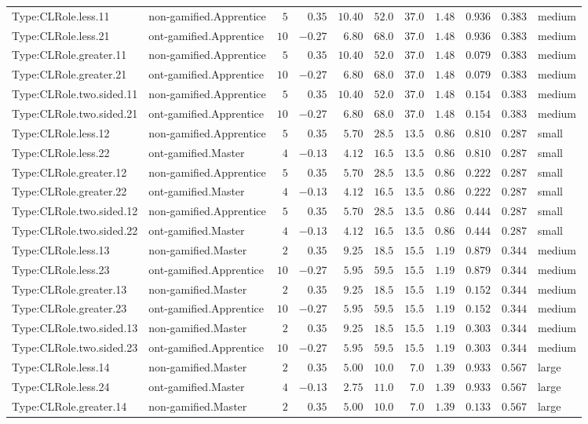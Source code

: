 \documentclass[6pt,a4paper]{article}
\begin{document}
{\begin{longtable}{llrrrrrrrrl}
Type:CLRole.less.11&non-gamified.Apprentice&$ 5$&$ 0.35$&$10.40$&$ 52.0$&$37.0$&$1.48$&$0.936$&$0.383$&medium\tabularnewline
Type:CLRole.less.21&ont-gamified.Apprentice&$10$&$-0.27$&$ 6.80$&$ 68.0$&$37.0$&$1.48$&$0.936$&$0.383$&medium\tabularnewline
Type:CLRole.greater.11&non-gamified.Apprentice&$ 5$&$ 0.35$&$10.40$&$ 52.0$&$37.0$&$1.48$&$0.079$&$0.383$&medium\tabularnewline
Type:CLRole.greater.21&ont-gamified.Apprentice&$10$&$-0.27$&$ 6.80$&$ 68.0$&$37.0$&$1.48$&$0.079$&$0.383$&medium\tabularnewline
Type:CLRole.two.sided.11&non-gamified.Apprentice&$ 5$&$ 0.35$&$10.40$&$ 52.0$&$37.0$&$1.48$&$0.154$&$0.383$&medium\tabularnewline
Type:CLRole.two.sided.21&ont-gamified.Apprentice&$10$&$-0.27$&$ 6.80$&$ 68.0$&$37.0$&$1.48$&$0.154$&$0.383$&medium\tabularnewline
Type:CLRole.less.12&non-gamified.Apprentice&$ 5$&$ 0.35$&$ 5.70$&$ 28.5$&$13.5$&$0.86$&$0.810$&$0.287$&small\tabularnewline
Type:CLRole.less.22&ont-gamified.Master&$ 4$&$-0.13$&$ 4.12$&$ 16.5$&$13.5$&$0.86$&$0.810$&$0.287$&small\tabularnewline
Type:CLRole.greater.12&non-gamified.Apprentice&$ 5$&$ 0.35$&$ 5.70$&$ 28.5$&$13.5$&$0.86$&$0.222$&$0.287$&small\tabularnewline
Type:CLRole.greater.22&ont-gamified.Master&$ 4$&$-0.13$&$ 4.12$&$ 16.5$&$13.5$&$0.86$&$0.222$&$0.287$&small\tabularnewline
Type:CLRole.two.sided.12&non-gamified.Apprentice&$ 5$&$ 0.35$&$ 5.70$&$ 28.5$&$13.5$&$0.86$&$0.444$&$0.287$&small\tabularnewline
Type:CLRole.two.sided.22&ont-gamified.Master&$ 4$&$-0.13$&$ 4.12$&$ 16.5$&$13.5$&$0.86$&$0.444$&$0.287$&small\tabularnewline
Type:CLRole.less.13&non-gamified.Master&$ 2$&$ 0.35$&$ 9.25$&$ 18.5$&$15.5$&$1.19$&$0.879$&$0.344$&medium\tabularnewline
Type:CLRole.less.23&ont-gamified.Apprentice&$10$&$-0.27$&$ 5.95$&$ 59.5$&$15.5$&$1.19$&$0.879$&$0.344$&medium\tabularnewline
Type:CLRole.greater.13&non-gamified.Master&$ 2$&$ 0.35$&$ 9.25$&$ 18.5$&$15.5$&$1.19$&$0.152$&$0.344$&medium\tabularnewline
Type:CLRole.greater.23&ont-gamified.Apprentice&$10$&$-0.27$&$ 5.95$&$ 59.5$&$15.5$&$1.19$&$0.152$&$0.344$&medium\tabularnewline
Type:CLRole.two.sided.13&non-gamified.Master&$ 2$&$ 0.35$&$ 9.25$&$ 18.5$&$15.5$&$1.19$&$0.303$&$0.344$&medium\tabularnewline
Type:CLRole.two.sided.23&ont-gamified.Apprentice&$10$&$-0.27$&$ 5.95$&$ 59.5$&$15.5$&$1.19$&$0.303$&$0.344$&medium\tabularnewline
Type:CLRole.less.14&non-gamified.Master&$ 2$&$ 0.35$&$ 5.00$&$ 10.0$&$ 7.0$&$1.39$&$0.933$&$0.567$&large\tabularnewline
Type:CLRole.less.24&ont-gamified.Master&$ 4$&$-0.13$&$ 2.75$&$ 11.0$&$ 7.0$&$1.39$&$0.933$&$0.567$&large\tabularnewline
Type:CLRole.greater.14&non-gamified.Master&$ 2$&$ 0.35$&$ 5.00$&$ 10.0$&$ 7.0$&$1.39$&$0.133$&$0.567$&large\tabularnewline

\end{longtable}}
\end{document}
